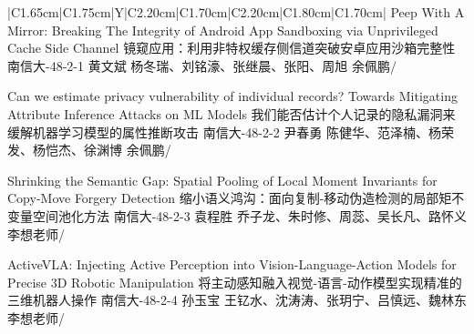 \Needspace{7.5cm}
\begin{tabularx}{\textwidth}{|C{1.65cm}|C{1.75cm}|Y|C{2.20cm}|C{1.70cm}|C{2.20cm}|C{1.80cm}|C{1.70cm}|}
\HeaderRow
{}
{Peep With A Mirror: Breaking The Integrity of
Android App Sandboxing via Unprivileged
Cache Side Channel  \newline 镜窥应用：利用非特权缓存侧信道突破安卓应用沙箱完整性 }
{南信大-48-2-1}
{黄文斌}
{杨冬瑞、刘铭濠、张继晨、张阳、周旭}
{余佩鹏}{/}


{Can we estimate privacy vulnerability of individual records? Towards Mitigating Attribute Inference Attacks on ML Models  \newline 我们能否估计个人记录的隐私漏洞来缓解机器学习模型的属性推断攻击 }
{南信大-48-2-2}
{尹春勇}
{陈健华、范泽楠、杨荣发、杨恺杰、徐渊博}
{余佩鹏}{/}



{Shrinking the Semantic Gap: Spatial Pooling of Local Moment Invariants for Copy-Move Forgery Detection  \newline  缩小语义鸿沟：面向复制-移动伪造检测的局部矩不变量空间池化方法}
{南信大-48-2-3}
{袁程胜}
{乔子龙、朱时修、周蕊、吴长凡、路怀义}
{李想老师}{/}

{ActiveVLA: Injecting Active Perception into Vision-Language-Action Models for Precise 3D Robotic Manipulation  \newline 将主动感知融入视觉-语言-动作模型实现精准的三维机器人操作 }
{南信大-48-2-4}
{孙玉宝}
{王钇水、沈涛涛、张玥宁、吕慎远、魏林东}
{李想老师}{/}
\end{tabularx}
\BlockGap









